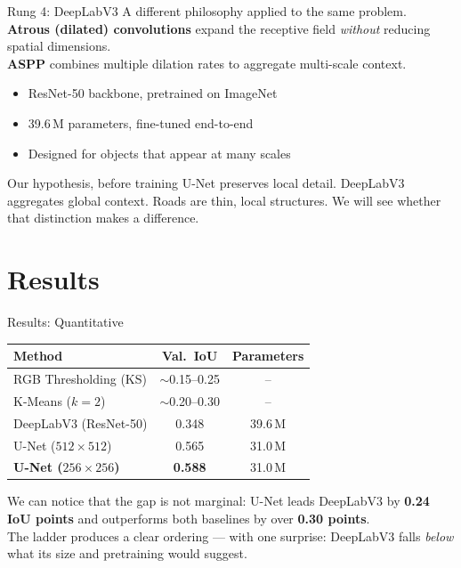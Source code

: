 \documentclass{beamer}
\begin{document}
\begin{frame}{Rung 4: DeepLabV3}
  A different philosophy applied to the same problem. \\[0.4em]
  \textbf{Atrous (dilated) convolutions} expand the receptive field \textit{without} reducing spatial dimensions. \\[0.4em]
  \textbf{ASPP} combines multiple dilation rates to aggregate multi-scale context. \\[0.4em]
  \begin{itemize}
    \item ResNet-50 backbone, pretrained on ImageNet
    \item 39.6\,M parameters, fine-tuned end-to-end
    \item Designed for objects that appear at many scales
  \end{itemize}
  \vspace{0.5em}
  \begin{alertblock}{Our hypothesis, before training}
    U-Net preserves local detail. DeepLabV3 aggregates global context.
    Roads are thin, local structures.
    We will see whether that distinction makes a difference.
  \end{alertblock}
\end{frame}

\section{Results}

\begin{frame}{Results: Quantitative}
  \begin{center}
    \begin{tabular}{lcc}
      \toprule
      Method                  & Val.\ IoU        & Parameters \\
      \midrule
      RGB Thresholding (KS)   & $\sim$0.15--0.25 & -- \\
      K-Means ($k=2$)         & $\sim$0.20--0.30 & -- \\
      DeepLabV3 (ResNet-50)   & 0.348            & 39.6\,M \\
      U-Net ($512\times512$)  & 0.565            & 31.0\,M \\
      \textbf{U-Net ($256\times256$)} & \textbf{0.588}   & 31.0\,M \\
      \bottomrule
    \end{tabular}
  \end{center}
  \vspace{0.5em}
  We can notice that the gap is not marginal: U-Net leads DeepLabV3 by \textbf{0.24 IoU points}
  and outperforms both baselines by over \textbf{0.30 points}. \\[0.4em]
  The ladder produces a clear ordering --- with one surprise: DeepLabV3 falls \textit{below}
  what its size and pretraining would suggest.
\end{frame}
\end{document}
